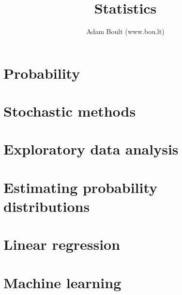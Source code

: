 \documentclass{book}
\begin{document}
\author{Adam Boult (www.bou.lt)}
\title{Statistics}
\maketitle

\setcounter{secnumdepth}{2}
\tableofcontents



\part{Probability}







\part{Stochastic methods}




\part{Exploratory data analysis}








\part{Estimating probability distributions}








\part{Linear regression}







\part{Machine learning}






\end{document}
